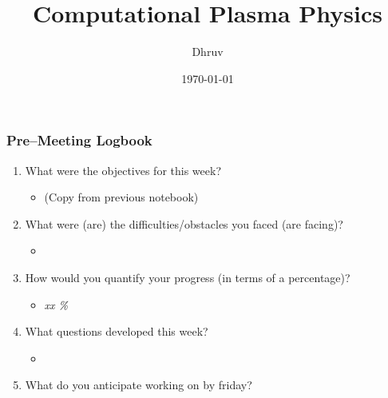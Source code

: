 \documentclass[12pt]{article}
\title{Computational Plasma Physics}
\author{Dhruv}
\date{\today}
\begin{document}
\maketitle

\subsubsection*{Pre--Meeting Logbook}
\begin{enumerate}
\item What were the objectives for this week?

  \begin{itemize}
  \item (Copy from previous notebook)
  \end{itemize}

\item What were (are) the difficulties/obstacles you faced (are
  facing)?

  \begin{itemize}
  \item
  \end{itemize}


\item How would you quantify your progress (in terms of a percentage)?

  \begin{itemize}
  \item {\em  xx \%}
  \end{itemize}

\item What questions developed this week?

    \begin{itemize}
    \item
    \end{itemize}

\item What do you anticipate working on by friday?


\end{enumerate}
\end{document}
